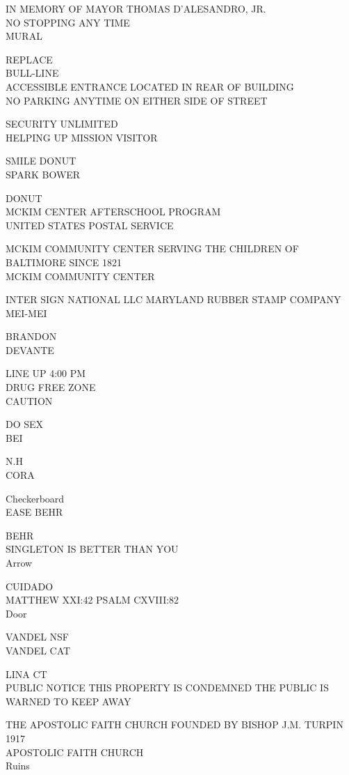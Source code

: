 \documentclass[10pt,letterpaper]{article}
\begin{document}
IN MEMORY OF MAYOR THOMAS D'ALESANDRO, JR.\\
NO STOPPING ANY TIME\\
MURAL

REPLACE\\
BULL{-}LINE\\
ACCESSIBLE ENTRANCE LOCATED IN REAR OF BUILDING\\
NO PARKING ANYTIME ON EITHER SIDE OF STREET

SECURITY UNLIMITED\\
HELPING UP MISSION VISITOR

SMILE DONUT\\
SPARK BOWER

DONUT\\
MCKIM CENTER AFTERSCHOOL PROGRAM\\
UNITED STATES POSTAL SERVICE

MCKIM COMMUNITY CENTER SERVING THE CHILDREN OF BALTIMORE SINCE 1821\\
MCKIM COMMUNITY CENTER

INTER SIGN NATIONAL LLC MARYLAND RUBBER STAMP COMPANY\\
MEI{-}MEI

BRANDON\\
DEVANTE

LINE UP 4:00 PM\\
DRUG FREE ZONE\\
CAUTION

DO SEX\\
BEI

N.H\\
CORA

Checkerboard\\
EASE BEHR

BEHR\\
SINGLETON IS BETTER THAN YOU\\
Arrow

CUIDADO\\
MATTHEW XXI:42 PSALM CXVIII:82\\
Door

VANDEL NSF\\
VANDEL CAT

LINA CT\\
PUBLIC NOTICE THIS PROPERTY IS CONDEMNED THE PUBLIC IS WARNED TO KEEP AWAY

THE APOSTOLIC FAITH CHURCH FOUNDED BY BISHOP J.M. TURPIN 1917\\
APOSTOLIC FAITH CHURCH\\
Ruins
\end{document}
